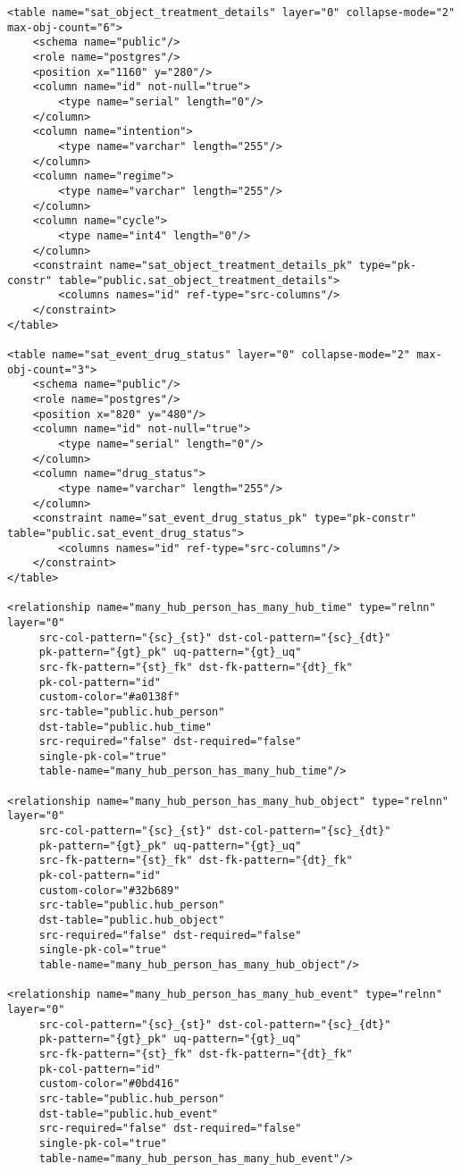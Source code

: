 \begin{lstlisting}
<table name="sat_object_treatment_details" layer="0" collapse-mode="2" max-obj-count="6">
	<schema name="public"/>
	<role name="postgres"/>
	<position x="1160" y="280"/>
	<column name="id" not-null="true">
		<type name="serial" length="0"/>
	</column>
	<column name="intention">
		<type name="varchar" length="255"/>
	</column>
	<column name="regime">
		<type name="varchar" length="255"/>
	</column>
	<column name="cycle">
		<type name="int4" length="0"/>
	</column>
	<constraint name="sat_object_treatment_details_pk" type="pk-constr" table="public.sat_object_treatment_details">
		<columns names="id" ref-type="src-columns"/>
	</constraint>
</table>

<table name="sat_event_drug_status" layer="0" collapse-mode="2" max-obj-count="3">
	<schema name="public"/>
	<role name="postgres"/>
	<position x="820" y="480"/>
	<column name="id" not-null="true">
		<type name="serial" length="0"/>
	</column>
	<column name="drug_status">
		<type name="varchar" length="255"/>
	</column>
	<constraint name="sat_event_drug_status_pk" type="pk-constr" table="public.sat_event_drug_status">
		<columns names="id" ref-type="src-columns"/>
	</constraint>
</table>

<relationship name="many_hub_person_has_many_hub_time" type="relnn" layer="0"
	 src-col-pattern="{sc}_{st}" dst-col-pattern="{sc}_{dt}"
	 pk-pattern="{gt}_pk" uq-pattern="{gt}_uq"
	 src-fk-pattern="{st}_fk" dst-fk-pattern="{dt}_fk"
	 pk-col-pattern="id"
	 custom-color="#a0138f"
	 src-table="public.hub_person"
	 dst-table="public.hub_time"
	 src-required="false" dst-required="false"
	 single-pk-col="true"
	 table-name="many_hub_person_has_many_hub_time"/>

<relationship name="many_hub_person_has_many_hub_object" type="relnn" layer="0"
	 src-col-pattern="{sc}_{st}" dst-col-pattern="{sc}_{dt}"
	 pk-pattern="{gt}_pk" uq-pattern="{gt}_uq"
	 src-fk-pattern="{st}_fk" dst-fk-pattern="{dt}_fk"
	 pk-col-pattern="id"
	 custom-color="#32b689"
	 src-table="public.hub_person"
	 dst-table="public.hub_object"
	 src-required="false" dst-required="false"
	 single-pk-col="true"
	 table-name="many_hub_person_has_many_hub_object"/>

<relationship name="many_hub_person_has_many_hub_event" type="relnn" layer="0"
	 src-col-pattern="{sc}_{st}" dst-col-pattern="{sc}_{dt}"
	 pk-pattern="{gt}_pk" uq-pattern="{gt}_uq"
	 src-fk-pattern="{st}_fk" dst-fk-pattern="{dt}_fk"
	 pk-col-pattern="id"
	 custom-color="#0bd416"
	 src-table="public.hub_person"
	 dst-table="public.hub_event"
	 src-required="false" dst-required="false"
	 single-pk-col="true"
	 table-name="many_hub_person_has_many_hub_event"/>


\end{lstlisting}
